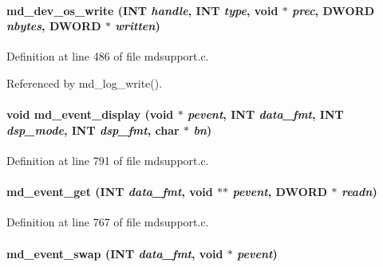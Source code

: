 \paragraph[{md\_\-dev\_\-os\_\-write}]{ md\_\-dev\_\-os\_\-write ({\bf INT} {\em handle}, \/  {\bf INT} {\em type}, \/  void $\ast$ {\em prec}, \/  {\bf DWORD} {\em nbytes}, \/  {\bf DWORD} $\ast$ {\em written})}\hfill\label{group__mdsupportincludecode_ga191a4e9021672539f4e7bc0f9c321558}


Definition at line 486 of file mdsupport.c.

Referenced by md\_\-log\_\-write().
\paragraph[{md\_\-event\_\-display}]{\setlength{\rightskip}{0pt plus 5cm}void md\_\-event\_\-display (void $\ast$ {\em pevent}, \/  {\bf INT} {\em data\_\-fmt}, \/  {\bf INT} {\em dsp\_\-mode}, \/  {\bf INT} {\em dsp\_\-fmt}, \/  char $\ast$ {\em bn})}\hfill\label{group__mdsupportincludecode_ga6d8232f01cf4adbfa8ad72040cfb2cdb}


Definition at line 791 of file mdsupport.c.
\paragraph[{md\_\-event\_\-get}]{ md\_\-event\_\-get ({\bf INT} {\em data\_\-fmt}, \/  void $\ast$$\ast$ {\em pevent}, \/  {\bf DWORD} $\ast$ {\em readn})}\hfill\label{group__mdsupportincludecode_gaf2bff635102ce991729c35d403cb29fb}


Definition at line 767 of file mdsupport.c.
\paragraph[{md\_\-event\_\-swap}]{ md\_\-event\_\-swap ({\bf INT} {\em data\_\-fmt}, \/  void $\ast$ {\em pevent})}\hfill\label{group__mdsupportincludecode_ga6014545a6ab4fcf758a3bf96f7f9f7f0}


